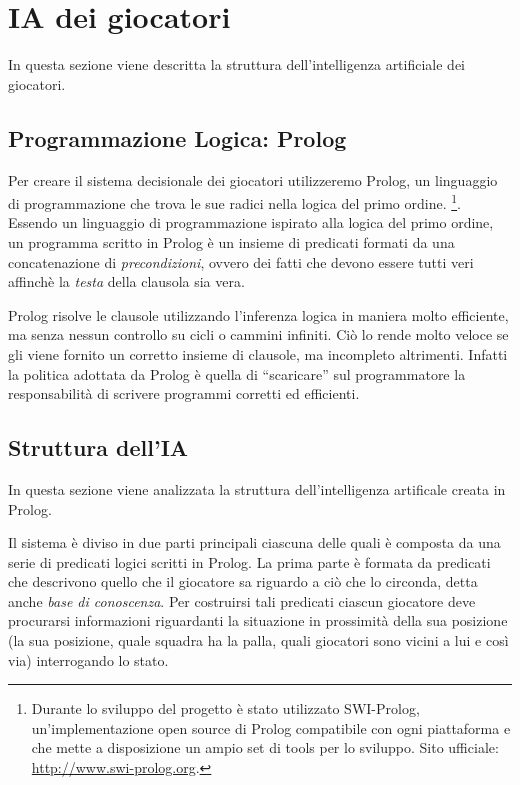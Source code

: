 
\section{IA dei giocatori}
\label{sec:ai_giocatori}

In questa sezione viene descritta la struttura dell'intelligenza artificiale dei giocatori.

\subsection{Programmazione Logica: Prolog}
Per creare il sistema decisionale dei giocatori utilizzeremo Prolog, un linguaggio di programmazione che trova le sue radici nella logica del primo ordine.
\footnote{Durante lo sviluppo del progetto \`{e} stato utilizzato SWI-Prolog, un'implementazione open source di Prolog compatibile con ogni piattaforma e che mette a disposizione un ampio set di tools per lo sviluppo. Sito ufficiale: \href{http://www.swi-prolog.org/}{http://www.swi-prolog.org}.}.
Essendo un linguaggio di programmazione ispirato alla logica del primo ordine, un programma scritto in Prolog \`{e} un insieme di predicati formati da una concatenazione di \emph{precondizioni}, ovvero dei fatti che devono essere tutti veri affinch\`{e} la \emph{testa} della clausola sia vera.

Prolog risolve le clausole utilizzando l'inferenza logica in maniera molto efficiente, ma senza nessun controllo su cicli o cammini infiniti. Ci\`{o} lo rende molto veloce se gli viene fornito un corretto insieme di clausole, ma incompleto altrimenti. Infatti la politica adottata da Prolog \`{e} quella di ``scaricare'' sul programmatore la responsabilit\`{a} di scrivere programmi corretti ed efficienti.\\

\subsection{Struttura dell'IA}
\label{sec:struct_ia}
In questa sezione viene analizzata la struttura dell'intelligenza artificale creata in Prolog.

Il sistema \`{e} diviso in due parti principali ciascuna delle quali \`{e} composta da una serie di predicati logici scritti in Prolog. La prima parte \`{e} formata da predicati che descrivono quello che il giocatore sa riguardo a ci\`{o} che lo circonda, detta anche \emph{base di conoscenza}. Per costruirsi tali predicati ciascun giocatore deve procurarsi informazioni riguardanti la situazione in prossimit\`{a} della sua posizione (la sua posizione, quale squadra ha la palla, quali giocatori sono vicini a lui e cos\`{i} via) interrogando lo stato.

